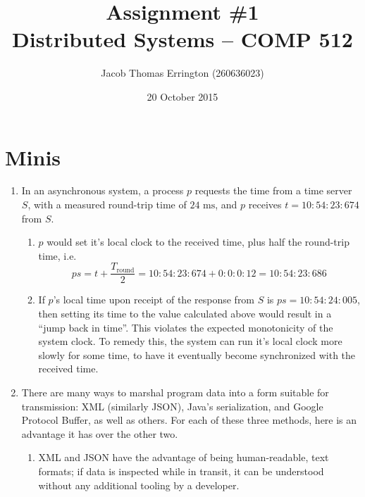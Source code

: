 \documentclass{article}
\author{Jacob Thomas Errington (260636023)}
\title{Assignment \#1\\Distributed Systems -- COMP 512}
\date{20 October 2015}
\newcommand{\ms}{\text{ ms}}
\begin{document}
\maketitle

\section{Minis}

\begin{enumerate}
    \item
        In an asynchronous system, a process $p$ requests the time from a time
        server $S$, with a measured round-trip time of $24\ms$, and $p$
        receives $t = 10:54:23:674$ from $S$.

        \begin{enumerate}
            \item
                $p$ would set it's local clock to the received time, plus half
                the round-trip time, i.e.
                $$
                ps
                = t + \frac{T_\text{round}}{2}
                = 10 : 54 : 23 : 674 + 0 : 0 : 0 : 12
                = 10 : 54 : 23 : 686
                $$

            \item
                If $p$'s local time upon receipt of the response from $S$ is
                $ps = 10 : 54 : 24 : 005$, then setting its time to the value
                calculated above would result in a ``jump back in time''. This
                violates the expected monotonicity of the system clock. To
                remedy this, the system can run it's local clock more slowly
                for some time, to have it eventually become synchronized with
                the received time.
        \end{enumerate}

    \item
        There are many ways to marshal program data into a form suitable
        for transmission: XML (similarly JSON), Java's serialization, and
        Google Protocol Buffer, as well as others. For each of these three
        methods, here is an advantage it has over the other two.

        \begin{enumerate}
            \item
                XML and JSON have the advantage of being human-readable,
                text formats; if data is inspected while in transit, it can
                be understood without any additional tooling by a
                developer.


\end{enumerate}
\end{enumerate}
\end{document}
